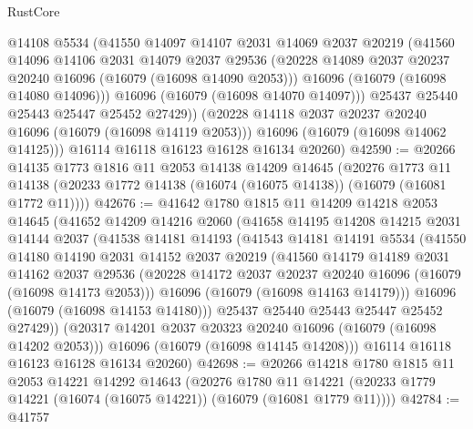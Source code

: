 \begin{lexlean}{RustCore}
\begin{coremodule}
            @14108
            @5534
            (@41550
              @14097
              @14107
              @2031
              @14069
              @2037
              @20219
              (@41560
                @14096
                @14106
                @2031
                @14079
                @2037
                @29536
                (@20228 @14089 @2037 @20237 @20240 @16096 (@16079 (@16098 @14090 @2053)))
                @16096
                (@16079 (@16098 @14080 @14096)))
              @16096
              (@16079 (@16098 @14070 @14097)))
            @25437
            @25440
            @25443
            @25447
            @25452
            @27429))
        (@20228 @14118 @2037 @20237 @20240 @16096 (@16079 (@16098 @14119 @2053)))
        @16096
        (@16079 (@16098 @14062 @14125)))
      @16114
      @16118
      @16123
      @16128
      @16134
      @20260)
@42590 := @20266
    @14135
    @1773
    @1816
    @11
    @2053
    @14138
    @14209
    @14645
    (@20276
      @1773
      @11
      @14138
      (@20233 @1772 @14138 (@16074 (@16075 @14138)) (@16079 (@16081 @1772 @11))))
@42676 := @41642
    @1780
    @1815
    @11
    @14209
    @14218
    @2053
    @14645
    (@41652
      @14209
      @14216
      @2060
      (@41658
        @14195
        @14208
        @14215
        @2031
        @14144
        @2037
        (@41538
          @14181
          @14193
          (@41543
            @14181
            @14191
            @5534
            (@41550
              @14180
              @14190
              @2031
              @14152
              @2037
              @20219
              (@41560
                @14179
                @14189
                @2031
                @14162
                @2037
                @29536
                (@20228 @14172 @2037 @20237 @20240 @16096 (@16079 (@16098 @14173 @2053)))
                @16096
                (@16079 (@16098 @14163 @14179)))
              @16096
              (@16079 (@16098 @14153 @14180)))
            @25437
            @25440
            @25443
            @25447
            @25452
            @27429))
        (@20317 @14201 @2037 @20323 @20240 @16096 (@16079 (@16098 @14202 @2053)))
        @16096
        (@16079 (@16098 @14145 @14208)))
      @16114
      @16118
      @16123
      @16128
      @16134
      @20260)
@42698 := @20266
    @14218
    @1780
    @1815
    @11
    @2053
    @14221
    @14292
    @14643
    (@20276
      @1780
      @11
      @14221
      (@20233 @1779 @14221 (@16074 (@16075 @14221)) (@16079 (@16081 @1779 @11))))
@42784 := @41757

\end{coremodule}
\end{lexlean}
